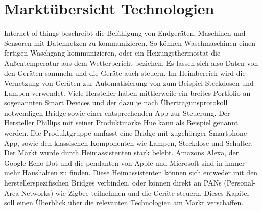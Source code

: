 \chapter{Marktübersicht Technologien}

\grqq Internet of things\grqq{} beschreibt die Befähigung von Endgeräten, Maschinen und Sensoren mit Datennetzen zu kommunizieren. So können Waschmaschinen einen fertigen Waschgang kommunizieren,
oder ein Heizungsthermostat die Außentemperatur aus dem Wetterbericht beziehen. Es lassen sich also Daten von den Geräten sammeln und die Geräte auch steuern. Im Heimbereich 
wird die Vernetzung von Geräten zur Automatisierung von zum Beispiel Steckdosen und Lampen verwendet.
Viele Hersteller haben mittlerweile ein breites Portfolio an sogenannten \grqq Smart Devices\grqq{} und der dazu
je nach Übertragunsprotokoll notwendigen \grqq Bridge\grqq{} sowie einer entsprechenden App zur Steuerung. Der Hersteller Phillips mit seiner Produktmarke \grqq Hue\grqq{}
kann als Beispiel genannt werden. Die Produktgruppe umfasst eine Bridge mit zugehöriger Smartphone App, sowie den klassischen Komponenten wie Lampen, Steckdose und Schalter.
Der Markt wurde durch Heimassistenten stark belebt. Amazons Alexa, der Google Echo Dot und die pendanten von Apple und Microsoft sind in immer mehr Haushalten zu finden.
Diese Heimassistenten können sich entweder mit den herstellerspezifischen Bridges verbinden, oder können direkt an PANs (Personal-Area-Networks) wie Zigbee
teilnehmen und die Geräte steuern. Dieses Kapitel soll einen Überblick über die relevanten Technologien am Markt verschaffen. 

